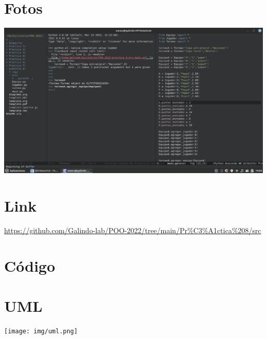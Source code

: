 \documentclass[11pt]{article}
\begin{document}
\section*{Fotos}
\label{sec:orge46e0a8}
\begin{center}
\includegraphics[width=.9\linewidth]{img/2.png}
\end{center}

\section*{Link}
\label{sec:org91307b6}
\url{https://github.com/Galindo-lab/POO-2022/tree/main/Pr\%C3\%A1ctica\%208/src}

\section*{Código}
\label{sec:org39c868c}





\section*{UML}
\label{sec:org087881c}
\begin{center}
\texttt{[image: img/uml.png]}
\end{center}
\end{document}
